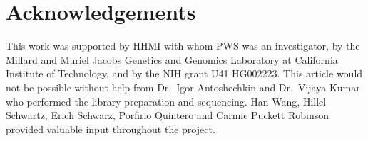 \documentclass[8pt, twocolumn]{article}
\begin{document}
\section*{Acknowledgements}
This work was supported by HHMI with whom PWS was an investigator, by the
Millard and Muriel Jacobs Genetics and Genomics Laboratory at California
Institute of Technology, and by the NIH grant U41 HG002223. This article
would not be possible without help from Dr.\ Igor Antoshechkin and Dr.\ Vijaya
Kumar who performed the library preparation and sequencing.
Han Wang, Hillel Schwartz, Erich Schwarz, Porfirio Quintero and
Carmie Puckett Robinson provided valuable input throughout the project.



\end{document}
